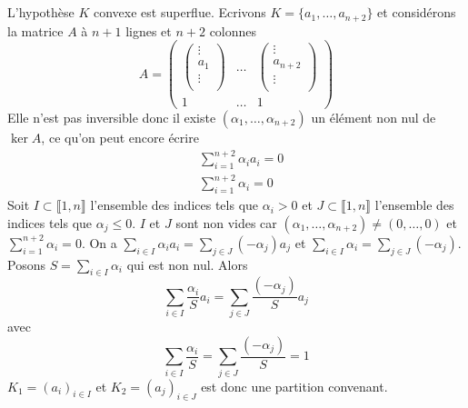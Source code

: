 \documentclass{report}
\begin{document}
\subsection{} \noindent{}\\ 
\\ 
\\
\noindent L'hypothèse $K$ convexe est superflue. Ecrivons $K=\{a_1,\ldots, a_{n+2}\}$ et considérons la matrice $A$ à $n+1$ lignes et $n+2$ colonnes 
$$A=\begin{pmatrix}
\begin{pmatrix}
\vdots \\
a_1\\
\vdots\\
\end{pmatrix} & \hdots & \begin{pmatrix}
\vdots \\
a_{n+2}\\
\vdots\\
\end{pmatrix} \\
1 & \hdots & 1
\end{pmatrix}$$
Elle n'est pas inversible donc il existe $(\alpha_1,\ldots,\alpha_{n+2})$ un élément non nul de $\ker A$, ce qu'on peut encore écrire $$\begin{aligned} &\sum_{i=1}^{n+2} \alpha_i a_i =0 \\
&\sum_{i=1}^{n+2} \alpha_i =0 \end{aligned}$$
Soit $I\subset \llbracket 1,n \rrbracket$ l'ensemble des indices tels que $\alpha_i>0$ et $J\subset \llbracket 1,n \rrbracket$ l'ensemble des indices tels que $\alpha_j\leq 0$. $I$ et $J$ sont non vides car $(\alpha_1,\ldots,\alpha_{n+2})\neq (0,\ldots,0)$ et $\sum_{i=1}^{n+2} \alpha_i =0$.\newline \newline
On a $\sum_{i\in I} \alpha_i a_i = \sum_{j\in J} (-\alpha_j)a_j$ et $\sum_{i\in I} \alpha_i = \sum_{j\in J} (-\alpha_j)$.\newline \newline
Posons $S=\sum_{i\in I} \alpha_i$ qui est non nul. Alors 
$$\sum_{i\in I} \frac{\alpha_i}{S} a_i = \sum_{j\in J} \frac{(-\alpha_j)}{S} a_j$$
 avec $$ \sum_{i\in I} \frac{\alpha_i}{S} = \sum_{j\in J} \frac{(-\alpha_j)}{S}=1$$
$K_1=(a_i)_{i\in I}$ et $K_2=(a_j)_{i\in J}$ est donc une partition convenant.
\end{document}
